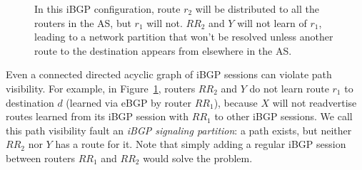 \begin{figure}[t]
\begin{center}
\begin{psfrags}
%
\end{psfrags}
\end{center}
\caption[An iBGP route reflector topology that violates path visibility.]{
In this iBGP configuration, route
$r_2$ will be distributed to all the routers in the AS, but
$r_1$ will not.  $RR_2$ and $Y$ will not learn of $r_1$, leading to a
network partition that won't be resolved unless another route to
the destination appears from elsewhere in the AS.}
\label{f:ibgp_vis_violation}
\end{figure}


Even a connected directed acyclic graph of iBGP sessions can violate
path visibility.  For example, in Figure~\ref{f:ibgp_vis_violation},
routers $RR_2$ and $Y$ do not learn route $r_1$ to destination $d$ (learned
via eBGP by router $RR_1$), because $X$ will not readvertise routes learned
from its iBGP session with $RR_1$ to other iBGP sessions.  We call this
path visibility fault an {\em iBGP signaling partition}: a
path exists, but neither $RR_2$ nor $Y$ has a route for it.  Note that
simply adding a regular iBGP session between routers $RR_1$ and $RR_2$ would
solve the problem.

